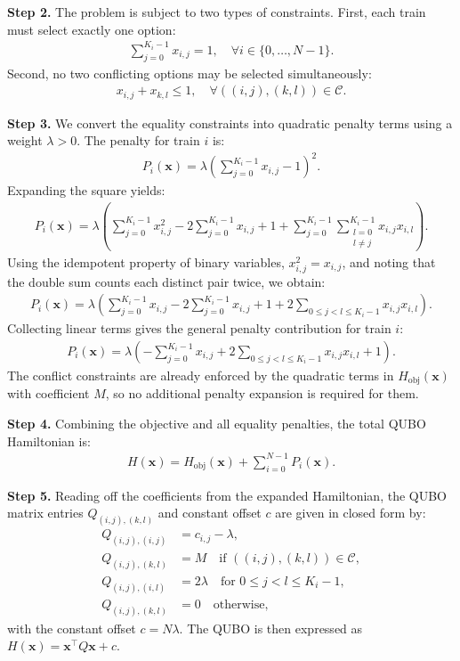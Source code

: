 \documentclass[12pt]{article}
\begin{document}
\textbf{Step 2.} The problem is subject to two types of constraints. First, each train must select exactly one option:
\begin{align}
\sum_{j=0}^{K_i-1} x_{i,j} = 1, \quad \forall i \in \{0, \dots, N-1\}.
\end{align}
Second, no two conflicting options may be selected simultaneously:
\begin{align}
x_{i,j} + x_{k,l} \le 1, \quad \forall ((i,j),(k,l)) \in \mathcal{C}.
\end{align}

\textbf{Step 3.} We convert the equality constraints into quadratic penalty terms using a weight $\lambda > 0$. The penalty for train $i$ is:
\begin{align}
P_i(\mathbf{x}) = \lambda \left( \sum_{j=0}^{K_i-1} x_{i,j} - 1 \right)^2.
\end{align}
Expanding the square yields:
\begin{align}
P_i(\mathbf{x}) = \lambda \left( \sum_{j=0}^{K_i-1} x_{i,j}^2 - 2\sum_{j=0}^{K_i-1} x_{i,j} + 1 + \sum_{j=0}^{K_i-1} \sum_{\substack{l=0 \\ l \neq j}}^{K_i-1} x_{i,j} x_{i,l} \right).
\end{align}
Using the idempotent property of binary variables, $x_{i,j}^2 = x_{i,j}$, and noting that the double sum counts each distinct pair twice, we obtain:
\begin{align}
P_i(\mathbf{x}) = \lambda \left( \sum_{j=0}^{K_i-1} x_{i,j} - 2\sum_{j=0}^{K_i-1} x_{i,j} + 1 + 2\sum_{0 \le j < l \le K_i-1} x_{i,j} x_{i,l} \right).
\end{align}
Collecting linear terms gives the general penalty contribution for train $i$:
\begin{align}
P_i(\mathbf{x}) = \lambda \left( -\sum_{j=0}^{K_i-1} x_{i,j} + 2\sum_{0 \le j < l \le K_i-1} x_{i,j} x_{i,l} + 1 \right).
\end{align}
The conflict constraints are already enforced by the quadratic terms in $H_{\text{obj}}(\mathbf{x})$ with coefficient $M$, so no additional penalty expansion is required for them.

\textbf{Step 4.} Combining the objective and all equality penalties, the total QUBO Hamiltonian is:
\begin{align}
H(\mathbf{x}) = H_{\text{obj}}(\mathbf{x}) + \sum_{i=0}^{N-1} P_i(\mathbf{x}).
\end{align}

\textbf{Step 5.} Reading off the coefficients from the expanded Hamiltonian, the QUBO matrix entries $Q_{(i,j),(k,l)}$ and constant offset $c$ are given in closed form by:
\begin{align}
Q_{(i,j),(i,j)} &= c_{i,j} - \lambda, \\
Q_{(i,j),(k,l)} &= M \quad \text{if } ((i,j),(k,l)) \in \mathcal{C}, \\
Q_{(i,j),(i,l)} &= 2\lambda \quad \text{for } 0 \le j < l \le K_i-1, \\
Q_{(i,j),(k,l)} &= 0 \quad \text{otherwise},
\end{align}
with the constant offset $c = N\lambda$. The QUBO is then expressed as $H(\mathbf{x}) = \mathbf{x}^\top Q \mathbf{x} + c$.
\end{document}
